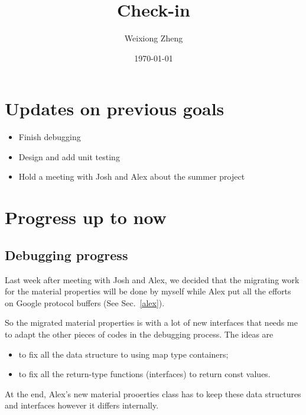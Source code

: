 \documentclass{article}
\title{Check-in} %
\author{Weixiong Zheng} %
\date{\today} %
\begin{document}
\maketitle %

\section{Updates on previous goals}
\begin{itemize}
	\item Finish debugging
	\item Design and add unit testing
	\item Hold a meeting with Josh and Alex about the summer project
\end{itemize}
\section{Progress up to now}
\subsection{Debugging progress}\label{debug}
Last week after meeting with Josh and Alex, we decided that the migrating work for the material properties will be done by myself while Alex put all the efforts on Google protocol buffers (See Sec.\ \ref{alex}). 

So the migrated material properties is with a lot of new interfaces that needs me to adapt
the other pieces of codes in the debugging process. The ideas are
\begin{itemize}
	\item to fix all the data structure to using map type containers;
	\item to fix all the return-type functions (interfaces) to return const values.
\end{itemize}

At the end, Alex's new material prooerties class has to keep these data structures and interfaces however it differs internally.
\end{document}
